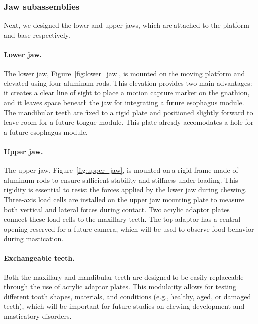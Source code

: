 \subsubsection{Jaw subassemblies}

Next, we designed the lower and upper jaws, which are attached to the platform and base respectively. 
\paragraph{Lower jaw.}The lower jaw, Figure~\ref{fig:lower_jaw}, is mounted on the moving platform and elevated using four aluminum rods. This elevation 
provides two main advantages: it creates a clear line of sight to place a motion capture marker on the gnathion, and it 
leaves space beneath the jaw for integrating a future esophagus module. The mandibular teeth are fixed to a rigid plate 
and positioned slightly forward to leave room for a future tongue module. This plate already accomodates a hole for a future esophagus module.
\paragraph{Upper jaw.}The upper jaw, Figure~\ref{fig:upper_jaw}, is mounted on a rigid frame made of aluminum rods to ensure sufficient stability and stiffness under loading. This 
rigidity is essential to resist the forces applied by the lower jaw during chewing. Three-axis load cells are installed on the 
upper jaw mounting plate to measure both vertical and lateral forces during contact. Two acrylic adaptor plates connect these load 
cells to the maxillary teeth. The top adaptor has a central opening reserved for a future camera, which will be used to observe food 
behavior during mastication.
\paragraph{Exchangeable teeth.}Both the maxillary and mandibular teeth are designed to be easily replaceable through the use of acrylic adaptor plates. This modularity 
allows for testing different tooth shapes, materials, and conditions (e.g., healthy, aged, or damaged teeth), which will be important for 
future studies on chewing development and masticatory disorders.

